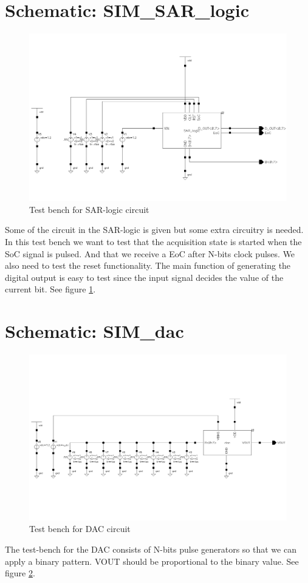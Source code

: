 \documentclass[english, a4paper,11pt]{article}
\begin{document}
\section*{Schematic: SIM\_SAR\_logic}
\begin{figure}[!ht]
 \centering
   \includegraphics[width=\textwidth]{img/SIM_SAR_logic.png}
   \caption{Test bench for SAR-logic circuit}
   \label{sim:logic}
\end{figure}
Some of the circuit in the SAR-logic is given but some extra circuitry is needed. In this test bench we want to test
that the acquisition state is started when the SoC signal is pulsed. And that we receive a EoC after N-bits clock pulses.
We also need to test the reset functionality. 
The main function of generating the digital output is easy to test since the input signal decides the value of the current bit.
See figure \ref{sim:logic}.

\section*{Schematic: SIM\_dac}
\begin{figure}[!ht]
 \centering
   \includegraphics[width=\textwidth]{img/SIM_dac.png}
   \caption{Test bench for DAC circuit}
   \label{sim:dac}
\end{figure}
The test-bench for the DAC consists of N-bits pulse generators so that we can apply a binary pattern. 
VOUT should be proportional to the binary value.
See figure \ref{sim:dac}.
\end{document}
